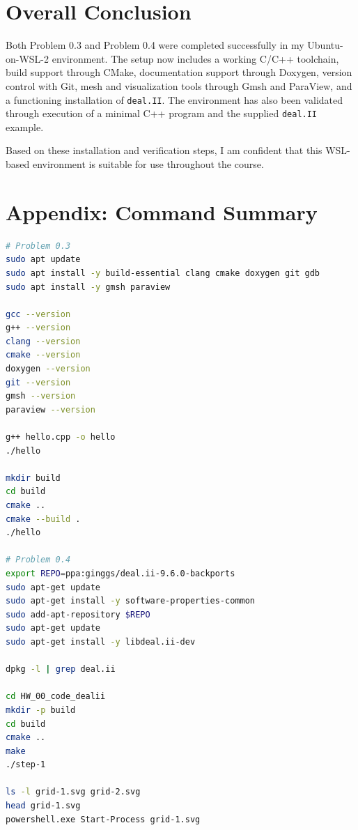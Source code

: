 \documentclass[11pt,a4paper]{article}
\begin{document}
\pagebreak


\section{Overall Conclusion}
Both Problem 0.3 and Problem 0.4 were completed successfully in my Ubuntu-on-WSL-2 environment. The setup now includes a working C/C++ toolchain, build support through CMake, documentation support through Doxygen, version control with Git, mesh and visualization tools through Gmsh and ParaView, and a functioning installation of \texttt{deal.II}. The environment has also been validated through execution of a minimal C++ program and the supplied \texttt{deal.II} example.

Based on these installation and verification steps, I am confident that this WSL-based environment is suitable for use throughout the course.

\pagebreak

\section*{Appendix: Command Summary}
\begin{lstlisting}[language=bash]
# Problem 0.3
sudo apt update
sudo apt install -y build-essential clang cmake doxygen git gdb
sudo apt install -y gmsh paraview

gcc --version
g++ --version
clang --version
cmake --version
doxygen --version
git --version
gmsh --version
paraview --version

g++ hello.cpp -o hello
./hello

mkdir build
cd build
cmake ..
cmake --build .
./hello

# Problem 0.4
export REPO=ppa:ginggs/deal.ii-9.6.0-backports
sudo apt-get update
sudo apt-get install -y software-properties-common
sudo add-apt-repository $REPO
sudo apt-get update
sudo apt-get install -y libdeal.ii-dev

dpkg -l | grep deal.ii

cd HW_00_code_dealii
mkdir -p build
cd build
cmake ..
make
./step-1

ls -l grid-1.svg grid-2.svg
head grid-1.svg
powershell.exe Start-Process grid-1.svg
\end{lstlisting}
\end{document}
